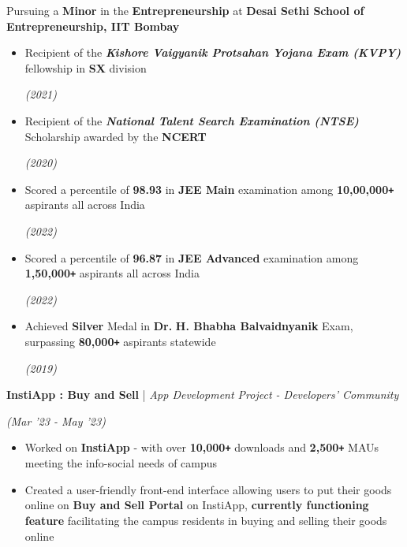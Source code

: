 \documentclass[10pt]{article}
\def\Plus{\texttt{\texttt{+}}}
\newcommand{\xfill}[2][1ex]{
	\dimen0=#2\advance\dimen0 by #1
	\leaders\hrule height \dimen0 depth -#1\hfill
}
\renewcommand{\section}[1]{
	\vspace{5pt}
	{\color{Blue}{\Large\scshape\raggedright #1\xfill[0pt]{0.5pt}}}
}
\renewcommand{\subsection}[4]{
	\def\temp{#4}
	\vspace{2pt}
	{
		\large
		{\color{Green} \textbf{#1}} | {\sl #2} \filldate{#3}
		\ifx\temp\empty
		\else
		{
			\\[0.1em]
			\fontsize{11}{13.2}\selectfont
			\sl #4
		}
		\fi
	}
}
\newcommand{\filldate}[1]{\strut\hfill {\small \textit{(#1)}}}
\newif\iflong
\begin{document}


Pursuing a \textbf{Minor} in the \textbf{Entrepreneurship} at \textbf{Desai Sethi School of Entrepreneurship, IIT Bombay}

\vspace{0.5em}
\section{Scholastic Achievements}
\vspace{2pt}
\begin{itemize}
    \item Recipient of the \textbf{\textit{Kishore Vaigyanik Protsahan Yojana Exam (KVPY)}} fellowship in \textbf{SX} division
    \filldate{2021}
    \item Recipient of the \textit{\textbf{National Talent Search Examination (NTSE)}} Scholarship awarded by the \textbf{NCERT}
    \filldate{2020}
    \item Scored a percentile of \textbf{98.93} in \textbf{JEE Main} examination among \textbf{10,00,000\Plus} aspirants all across India
    \filldate{2022}
    \item Scored a percentile of \textbf{96.87} in \textbf{JEE Advanced} examination among \textbf{1,50,000\Plus} aspirants all across India
    \filldate{2022}
    \item Achieved \textbf{Silver} Medal in \textbf{Dr.} \textbf{H. Bhabha Balvaidnyanik} Exam, surpassing \textbf{80,000\Plus} aspirants statewide
    \filldate{2019}

\end{itemize}

\section{Key Projects And Experience}
\vspace{5px}

\subsection{InstiApp : Buy and Sell}{App Development Project - Developers' Community}{Mar '23 - May '23}{}
\begin{itemize}
        \item Worked on \textbf{InstiApp} - with over \textbf{10,000\Plus} downloads and \textbf{2,500\Plus} MAUs meeting the info-social needs of campus\vspace{1pt}
	\item Created a user-friendly front-end interface allowing users to put their goods online on \textbf{Buy and Sell Portal} on InstiApp, \textbf{currently functioning }\textbf{feature} facilitating the campus residents in buying and selling their goods online

\end{itemize}
\end{document}
